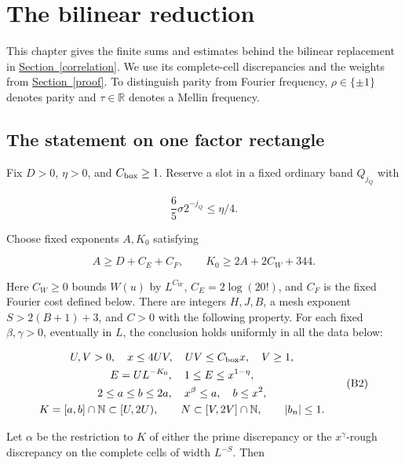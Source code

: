 \hypertarget{bilinear}{%
\section{The bilinear reduction}\label{bilinear}}

This chapter gives the finite sums and estimates behind the bilinear
replacement in
\protect\hyperlink{correlation}{Section~\ref{correlation}}. We use its
complete-cell discrepancies and the weights from
\protect\hyperlink{proof}{Section~\ref{proof}}. To distinguish parity
from Fourier frequency, \(\rho\in\{\pm1\}\) denotes parity and
\(\tau\in\mathbb R\) denotes a Mellin frequency.


\hypertarget{bilinear-the-statement-on-one-factor-rectangle}{%
\subsection{The statement on one factor
rectangle}\label{bilinear-the-statement-on-one-factor-rectangle}}

Fix \(D>0\), \(\eta>0\), and \(C_{\rm box}\ge1\). Reserve a slot in a
fixed ordinary band \(Q_{j_Q}\) with

\[
\frac65\sigma2^{-j_Q}\le\eta/4.
\]

Choose fixed exponents \(A,K_0\) satisfying

\[
A\ge D+C_E+C_F,\qquad K_0\ge2A+2C_W+344. \tag{B1}
\]

Here \(C_W\ge0\) bounds \(W(u)\) by \(L^{C_W}\), \(C_E=2\log(20!)\), and
\(C_F\) is the fixed Fourier cost defined below. There are integers
\(H,J,B\), a mesh exponent \(S>2(B+1)+3\), and \(C>0\) with the
following property. For each fixed \(\beta,\gamma>0\), eventually in
\(L\), the conclusion holds uniformly in all the data below:

\[
\begin{gathered}
U,V>0,\quad x\le4UV,\quad UV\le C_{\rm box}x,\quad V\ge1,\\
E=UL^{-K_0},\quad1\le E\le x^{1-\eta},\\
2\le a\le b\le2a,\quad x^\beta\le a,\quad b\le x^2,\\
K=[a,b]\cap\mathbb N\subset[U,2U),\qquad
N\subset[V,2V]\cap\mathbb N,\qquad |b_n|\le1.
\end{gathered} \tag{B2}
\]

Let \(\alpha\) be the restriction to \(K\) of either the prime
discrepancy or the \(x^\gamma\)-rough discrepancy on the complete cells
of width \(L^{-S}\). Then

